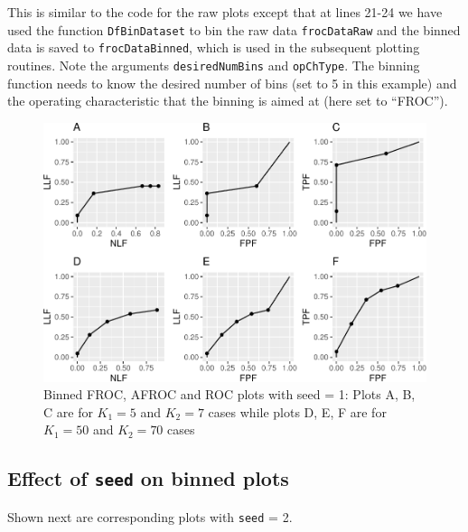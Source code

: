 \documentclass[
]{book}
\begin{document}
This is similar to the code for the raw plots except that at lines 21-24 we have used the function \texttt{DfBinDataset} to bin the raw data \texttt{frocDataRaw} and the binned data is saved to \texttt{frocDataBinned}, which is used in the subsequent plotting routines. Note the arguments \texttt{desiredNumBins} and \texttt{opChType}. The binning function needs to know the desired number of bins (set to 5 in this example) and the operating characteristic that the binning is aimed at (here set to ``FROC'').

\begin{figure}
\centering
\includegraphics{13b-froc-empirical2_files/figure-latex/froc-afroc-roc-binned-seed1-1.pdf}
\caption{\label{fig:froc-afroc-roc-binned-seed1}Binned FROC, AFROC and ROC plots with seed = 1: Plots A, B, C are for \(K_1 = 5\) and \(K_2 = 7\) cases while plots D, E, F are for \(K_1 = 50\) and \(K_2 = 70\) cases}
\end{figure}

\hypertarget{effect-of-seed-on-binned-plots}{%
\subsection{\texorpdfstring{Effect of \texttt{seed} on binned plots}{Effect of seed on binned plots}}\label{effect-of-seed-on-binned-plots}}

Shown next are corresponding plots with \texttt{seed} = 2.
\end{document}
